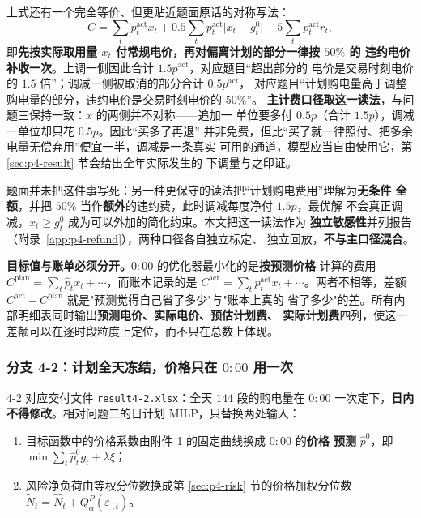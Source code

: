 上式还有一个完全等价、但更贴近题面原话的对称写法：
$$
C=\sum_t p_t^{\mathrm{act}}x_t
+0.5\sum_t p_t^{\mathrm{act}}\big|x_t-g^0_t\big|
+5\sum_t p_t^{\mathrm{act}}r_t ,
$$
即\textbf{先按实际取用量 $x_t$ 付常规电价，再对偏离计划的部分一律按 $50\%$ 的
违约电价补收一次}。上调一侧因此合计 $1.5p^{\mathrm{act}}$，对应题目“超出部分的
电价是交易时刻电价的 $1.5$ 倍”；调减一侧被取消的部分合计 $0.5p^{\mathrm{act}}$，
对应题目“计划购电量高于调整购电量的部分，违约电价是交易时刻电价的 $50\%$”。
\textbf{主计费口径取这一读法}，与问题三保持一致：$x$ 的两侧并不对称——追加一
单位要多付 $0.5p$（合计 $1.5p$），调减一单位却只花 $0.5p$。因此“买多了再退”
并非免费，但比“买了就一律照付、把多余电量无偿弃用”便宜一半，调减是一条真实
可用的通道，模型应当自由使用它，第 \ref{sec:p4-result} 节会给出全年实际发生的
下调量与之印证。

题面并未把这件事写死：另一种更保守的读法把“计划购电费用”理解为\textbf{无条件
全额}，并把 $50\%$ 当作\textbf{额外}的违约费，此时调减每度净付 $1.5p$，最优解
不会真正调减，$x_t\ge g^0_t$ 成为可以外加的简化约束。本文把这一读法作为
\textbf{独立敏感性}并列报告（附录~\ref{app:p4-refund}），两种口径各自独立标定、
独立回放，\textbf{不与主口径混合}。

\textbf{目标值与账单必须分开。}$0{:}00$ 的优化器最小化的是\textbf{按预测价格}
计算的费用 $C^{\mathrm{plan}}=\sum_t\widehat p_t x_t+\cdots$，而账本记录的是
$C^{\mathrm{act}}=\sum_t p_t^{\mathrm{act}}x_t+\cdots$。两者不相等，差额
$C^{\mathrm{act}}-C^{\mathrm{plan}}$ 就是"预测觉得自己省了多少"与"账本上真的
省了多少"的差。所有内部明细表同时输出\textbf{预测电价、实际电价、预估计划费、
实际计划费}四列，使这一差额可以在逐时段粒度上定位，而不只在总数上体现。

\subsubsection{分支 4-2：计划全天冻结，价格只在 $0{:}00$ 用一次}

4-2 对应交付文件 \texttt{result4-2.xlsx}：全天 $144$ 段的购电量在 $0{:}00$
一次定下，\textbf{日内不得修改}。相对问题二的日计划 MILP，只替换两处输入：

\begin{enumerate}
  \item 目标函数中的价格系数由附件 1 的固定曲线换成 $0{:}00$ 的\textbf{价格
        预测} $\widehat p^{0}$，即 $\min\sum_t\widehat p^{0}_t g_t+\lambda\xi$；
  \item 风险净负荷由等权分位数换成第 \ref{sec:p4-risk} 节的价格加权分位数
        $\widetilde N_t=\widehat N_t+Q^{P}_{\alpha}(\varepsilon_{\cdot,t})$。
\end{enumerate}


